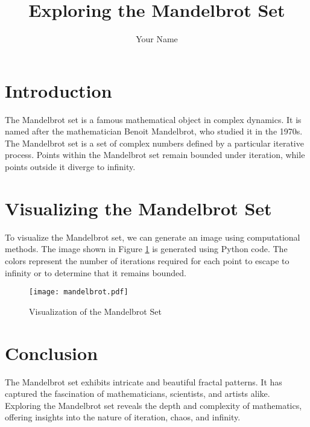 \documentclass{article}
\title{Exploring the Mandelbrot Set}
\author{Your Name}
\begin{document}
\maketitle

\section{Introduction}
The Mandelbrot set is a famous mathematical object in complex dynamics. It is named after the mathematician Benoit Mandelbrot, who studied it in the 1970s. The Mandelbrot set is a set of complex numbers defined by a particular iterative process. Points within the Mandelbrot set remain bounded under iteration, while points outside it diverge to infinity.

\section{Visualizing the Mandelbrot Set}
To visualize the Mandelbrot set, we can generate an image using computational methods. The image shown in Figure \ref{fig:mandelbrot} is generated using Python code. The colors represent the number of iterations required for each point to escape to infinity or to determine that it remains bounded.

\begin{figure}[h]
  \centering
  \texttt{[image: mandelbrot.pdf]}
  \caption{Visualization of the Mandelbrot Set}
  \label{fig:mandelbrot}
\end{figure}

\section{Conclusion}
The Mandelbrot set exhibits intricate and beautiful fractal patterns. It has captured the fascination of mathematicians, scientists, and artists alike. Exploring the Mandelbrot set reveals the depth and complexity of mathematics, offering insights into the nature of iteration, chaos, and infinity.
\end{document}
